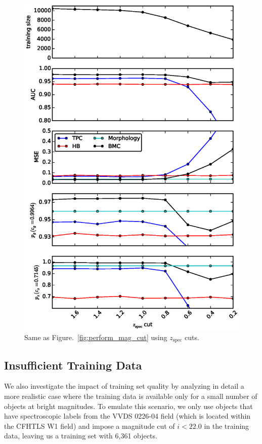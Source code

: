 \documentclass[useAMS,usenatbib]{mn2e}
\begin{document}
\begin{figure}
\begin{minipage}[b]{0.49\linewidth}
    \includegraphics[width=\textwidth]{figures/perform_z_cut.eps}
    \caption{Same as Figure.~\ref{fig:perform_mag_cut} using
      $z_{\text{spec}}$ cuts.}
    \label{fig:perform_z_cut}
  \end{minipage}
\end{figure}


\subsection{Insufficient Training Data}
  \label{section:poor_training}
  
We also investigate the impact of training set quality
by analyzing in detail a more realistic case
where the training data is available
only for a small number of objects at bright magnitudes.
To emulate this scenario,
we only use objects that have spectroscopic labels
from the VVDS 0226-04 field (which is located within the CFHTLS W1 field)
and impose a magnitude cut of $i < 22.0$ in the training data,
leaving us a training set with 6,361 objects.
\end{document}

